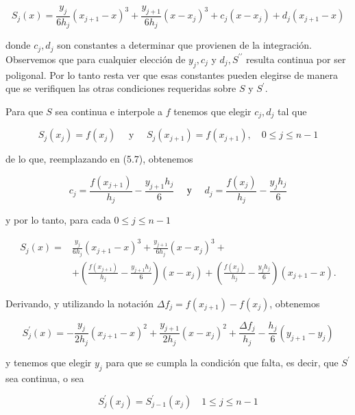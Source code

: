 \documentclass[10pt]{article}
\begin{document}
\begin{equation*}
S_{j}(x)=\frac{y_{j}}{6 h_{j}}\left(x_{j+1}-x\right)^{3}+\frac{y_{j+1}}{6 h_{j}}\left(x-x_{j}\right)^{3}+c_{j}\left(x-x_{j}\right)+d_{j}\left(x_{j+1}-x\right) \tag{5.7}
\end{equation*}


donde $c_{j}, d_{j}$ son constantes a determinar que provienen de la integración.\\
Observemos que para cualquier elección de $y_{j}, c_{j}$ y $d_{j}, S^{\prime \prime}$ resulta continua por ser poligonal. Por lo tanto resta ver que esas constantes pueden elegirse de manera que se verifiquen las otras condiciones requeridas sobre $S$ y $S^{\prime}$.

Para que $S$ sea continua e interpole a $f$ tenemos que elegir $c_{j}, d_{j}$ tal que

$$
S_{j}\left(x_{j}\right)=f\left(x_{j}\right) \quad \text { y } \quad S_{j}\left(x_{j+1}\right)=f\left(x_{j+1}\right), \quad 0 \leq j \leq n-1
$$

de lo que, reemplazando en (5.7), obtenemos

$$
c_{j}=\frac{f\left(x_{j+1}\right)}{h_{j}}-\frac{y_{j+1} h_{j}}{6} \quad \text { у } \quad d_{j}=\frac{f\left(x_{j}\right)}{h_{j}}-\frac{y_{j} h_{j}}{6}
$$

y por lo tanto, para cada $0 \leq j \leq n-1$

$$
\begin{aligned}
S_{j}(x)= & \frac{y_{j}}{6 h_{j}}\left(x_{j+1}-x\right)^{3}+\frac{y_{j+1}}{6 h_{j}}\left(x-x_{j}\right)^{3}+ \\
& +\left(\frac{f\left(x_{j+1}\right)}{h_{j}}-\frac{y_{j+1} h_{j}}{6}\right)\left(x-x_{j}\right)+\left(\frac{f\left(x_{j}\right)}{h_{j}}-\frac{y_{j} h_{j}}{6}\right)\left(x_{j+1}-x\right) .
\end{aligned}
$$

Derivando, y utilizando la notación $\Delta f_{j}=f\left(x_{j+1}\right)-f\left(x_{j}\right)$, obtenemos

$$
S_{j}^{\prime}(x)=-\frac{y_{j}}{2 h_{j}}\left(x_{j+1}-x\right)^{2}+\frac{y_{j+1}}{2 h_{j}}\left(x-x_{j}\right)^{2}+\frac{\Delta f_{j}}{h_{j}}-\frac{h_{j}}{6}\left(y_{j+1}-y_{j}\right)
$$

y tenemos que elegir $y_{j}$ para que se cumpla la condición que falta, es decir, que $S^{\prime}$ sea continua, o sea

$$
S_{j}^{\prime}\left(x_{j}\right)=S_{j-1}^{\prime}\left(x_{j}\right) \quad 1 \leq j \leq n-1
$$
\end{document}
